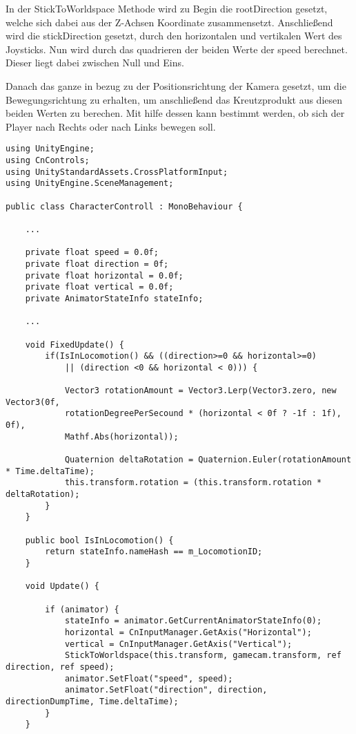 In der StickToWorldspace Methode wird zu Begin die rootDirection gesetzt, welche sich dabei aus der Z-Achsen Koordinate zusammensetzt. Anschließend wird die stickDirection gesetzt, durch den horizontalen und vertikalen Wert des Joysticks. Nun wird durch das quadrieren der beiden Werte der speed berechnet. Dieser liegt dabei zwischen Null und Eins.

Danach das ganze in bezug zu der Positionsrichtung der Kamera gesetzt, um die Bewegungsrichtung zu erhalten, um anschließend das Kreutzprodukt aus diesen beiden Werten zu berechen. Mit hilfe dessen kann bestimmt werden, ob sich der Player nach Rechts oder nach Links bewegen soll.

\begin{scriptsize}
\lstset{
	float,
	caption=Skript CharacterController.cs, 
	language=[Sharp]C, 
	frame=single,  
	showstringspaces=false, 
	showspaces=false, 
	numbers=left, 
	captionpos=b, 
	belowcaptionskip=4pt,
	basicstyle=\ttfamily
} 
\newpage
\begin{lstlisting}[label=lst:c_charactercontroller]
using UnityEngine;
using CnControls;
using UnityStandardAssets.CrossPlatformInput;
using UnityEngine.SceneManagement;

public class CharacterControll : MonoBehaviour {

	...

    private float speed = 0.0f;
    private float direction = 0f;
    private float horizontal = 0.0f;
    private float vertical = 0.0f;
    private AnimatorStateInfo stateInfo;

	...	
	
    void FixedUpdate() {
        if(IsInLocomotion() && ((direction>=0 && horizontal>=0) 
        	|| (direction <0 && horizontal < 0))) {
        	
            Vector3 rotationAmount = Vector3.Lerp(Vector3.zero, new Vector3(0f, 
            rotationDegreePerSecound * (horizontal < 0f ? -1f : 1f), 0f), 
            Mathf.Abs(horizontal));
            	
            Quaternion deltaRotation = Quaternion.Euler(rotationAmount * Time.deltaTime);
            this.transform.rotation = (this.transform.rotation * deltaRotation);
        }
    }

    public bool IsInLocomotion() {
        return stateInfo.nameHash == m_LocomotionID;
    }

    void Update() {
    
        if (animator) {
            stateInfo = animator.GetCurrentAnimatorStateInfo(0);
            horizontal = CnInputManager.GetAxis("Horizontal");
            vertical = CnInputManager.GetAxis("Vertical");
            StickToWorldspace(this.transform, gamecam.transform, ref direction, ref speed);
            animator.SetFloat("speed", speed);
            animator.SetFloat("direction", direction, directionDumpTime, Time.deltaTime);
        }
    }
    

\end{lstlisting}
\end{scriptsize}
